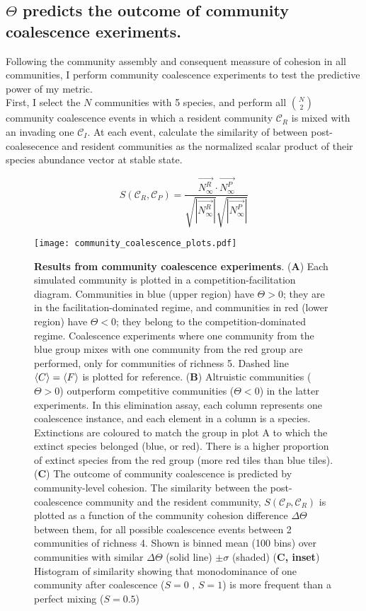 \documentclass[titlepage,11pt]{article}
\begin{document}
\begin{linenumbers}
			\subsection{$ \Theta $ predicts the outcome of community coalescence exeriments.}
			Following the community assembly and consequent meassure of cohesion in all communities, I perform community coalescence experiments to test the predictive power of my metric.\\
			First, I select the $ N $ communities with 5 species, and perform all $ {N}\choose{2} $ community coalescence events in which a resident community $\mathcal{C}_R$ is mixed with an invading one $ \mathcal{C}_I $. At each event, calculate the similarity of between post-coalesecence  and resident communities as the normalized scalar product of their species abundance vector at stable state.
			\begin{linenomath*}
				\begin{equation}
				S(\mathcal{C}_R, \mathcal{C}_P) = \frac{\vec{N^R_{\infty}} \cdot \vec{N^P_{\infty}}}{\sqrt{|\vec{N^R_{\infty}}|}\sqrt{|\vec{N^P_{\infty}}|}}
				\end{equation}
			\end{linenomath*}
			\begin{figure}
				\centering			
				\texttt{[image: community\_coalescence\_plots.pdf]}
				\caption{\textbf{Results from community coalescence experiments}. (\textbf{A}) Each simulated community is plotted in a competition-facilitation diagram. Communities in blue (upper region) have $ \Theta > 0 $; they are in the facilitation-dominated regime, and communities in red  (lower region) have $ \Theta <0 $; they belong to the competition-dominated regime. Coalescence experiments where one community from the blue group mixes with one community from the red group are performed, only for communities of richness 5. Dashed line $ \braket{C} = \braket{F} $ is plotted for reference. (\textbf{B}) Altruistic communities ($ \Theta > 0 $) outperform competitive communities ($ \Theta < 0 $) in the latter experiments. In this elimination assay, each column represents one coalescence instance, and each element in a column is a species. Extinctions are coloured to match the group in plot A to which the extinct species belonged (blue, or red). There is a higher proportion of extinct species from the red group (more red tiles than blue tiles). (\textbf{C}) The outcome of community coalescence is predicted by community-level cohesion. The similarity between the post-coalescence community and the resident community, $ S (\mathcal{C}_P, \mathcal{C}_R) $ is plotted as a function of the community cohesion difference $ \Delta \Theta $ between them, for all possible coalescence events between 2 communities of richness 4. Shown is binned mean (100 bins) over communities with similar $ \Delta \Theta $ (solid line) $ \pm \sigma $ (shaded) (\textbf{C, inset}) Histogram of similarity showing that monodominance of one community after coalescence  ($ S = 0 \text{ , } S = 1 $) is more frequent than a perfect mixing ($ S = 0.5 $) }
				\label{fig:community_coalescence_results}
		\end{figure}
			

\end{linenumbers}
\end{document}
